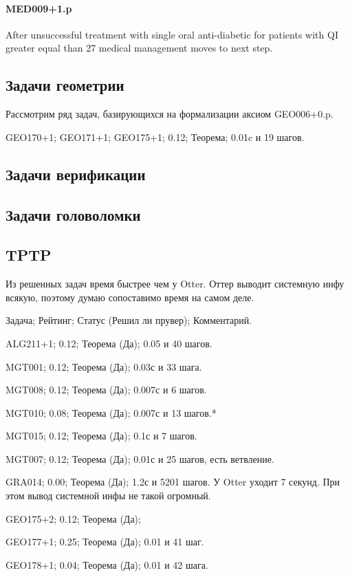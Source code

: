 \paragraph{MED009+1.p}
After unsuccessful treatment with single oral anti-diabetic for patients with QI greater equal than 27 medical management moves to next step.

\subsection{Задачи геометрии}
Рассмотрим ряд задач, базирующихся на формализации аксиом  GEO006+0.p.

GEO170+1;
GEO171+1;
GEO175+1; 0.12; Теорема; 0.01c и 19 шагов.

\subsection{Задачи верификации}

\subsection{Задачи головоломки}

\subsection{TPTP}
Из решенных задач время быстрее чем у Otter. Оттер выводит системную инфу всякую, поэтому думаю сопоставимо время на самом деле.

Задача; Рейтинг; Статус (Решил ли прувер); Комментарий.

ALG211+1; 0.12; Теорема (Да); 0.05 и 40 шагов.

MGT001; 0.12; Теорема (Да); 0.03с и 33 шага.

MGT008; 0.12; Теорема (Да); 0.007с и 6 шагов.

MGT010; 0.08; Теорема (Да); 0.007с и 13 шагов.*

MGT015; 0.12; Теорема (Да); 0.1с и 7 шагов.

MGT007; 0.12; Теорема (Да); 0.01с и 25 шагов, есть ветвление.

GRA014; 0.00; Теорема (Да); 1.2с и 5201 шагов. У Otter уходит 7 секунд. При этом вывод системной инфы не такой огромный.

GEO175+2; 0.12; Теорема (Да);

GEO177+1; 0.25; Теорема (Да); 0.01 и 41 шаг.

GEO178+1; 0.04; Теорема (Да); 0.01 и 42 шага.

